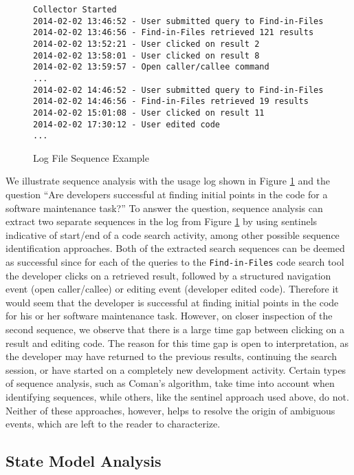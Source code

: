\begin{figure}
\hrulefill
\begin{verbatim}
Collector Started
2014-02-02 13:46:52 - User submitted query to Find-in-Files
2014-02-02 13:46:56 - Find-in-Files retrieved 121 results
2014-02-02 13:52:21 - User clicked on result 2
2014-02-02 13:58:01 - User clicked on result 8
2014-02-02 13:59:57 - Open caller/callee command 
...
2014-02-02 14:46:52 - User submitted query to Find-in-Files
2014-02-02 14:46:56 - Find-in-Files retrieved 19 results
2014-02-02 15:01:08 - User clicked on result 11
2014-02-02 17:30:12 - User edited code
...
\end{verbatim}
\hrulefill
	\caption{Log File Sequence Example}
	\label{log:logFileSequence}
\end{figure}
We illustrate sequence analysis with the usage log shown in Figure \ref{log:logFileSequence} and the question  ``Are developers successful at finding initial points in the code for a software maintenance task?''
To answer the question, sequence analysis can extract two separate sequences in the log from Figure \ref{log:logFileSequence} by using sentinels indicative of start/end of a code search activity, among other possible sequence identification approaches. Both of the extracted search sequences can be deemed as successful since for each of the queries to the {\tt Find-in-Files} code search tool the developer clicks on a retrieved result, followed by a structured navigation event (open caller/callee) or editing event (developer edited code). Therefore it would seem that the developer is successful at finding initial points in the code for his or her software maintenance task. However, on closer inspection of the second sequence, we observe that there is a large time gap between clicking on a result and editing code. The reason for this time gap is open to interpretation, as the developer may have returned to the previous results, continuing the search session, or have started on a completely new development activity. Certain types of sequence analysis, such as Coman's algorithm, take time into account when identifying sequences, while others, like the sentinel approach used above, do not. Neither of these approaches, however, helps to resolve the origin of ambiguous events, which are left to the reader to characterize.

\subsection{State Model Analysis}

